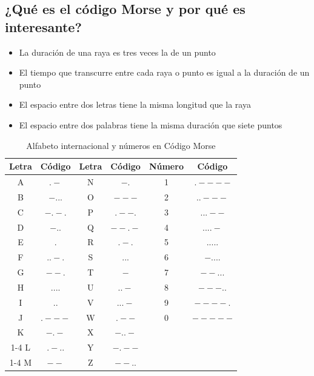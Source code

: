 \subsection{¿Qué es el código Morse y por qué es interesante?}
\begin{itemize}
    \item La duración de una raya es tres veces la de un punto
    \item El tiempo que transcurre entre cada raya o punto es igual a la duración de un punto
    \item El espacio entre dos letras tiene la misma longitud que la raya
    \item El espacio entre dos palabras tiene la misma duración que siete puntos
\end{itemize}
\begin{table}[h]
    \centering
    \renewcommand{\arraystretch}{1.2} %
    \begin{tabular}{|c|c|c|c|c|c|}
    \hline
    \textbf{Letra} & \textbf{Código} & \textbf{Letra} & \textbf{Código} & \textbf{Número} & \textbf{Código} \\ \hline
    A & \textbf{$.-$}    & N & \textbf{$-.$}    & 1 & \textbf{$.----$} \\ \hline
    B & \textbf{$-...$}  & O & \textbf{$---$}   & 2 & \textbf{$..---$} \\ \hline
    C & \textbf{$-.-.$}  & P & \textbf{$.--.$}  & 3 & \textbf{$...--$} \\ \hline
    D & \textbf{$-..$}   & Q & \textbf{$--.-$}  & 4 & \textbf{$....-$} \\ \hline
    E & \textbf{$.$}     & R & \textbf{$.-.$}   & 5 & \textbf{$.....$} \\ \hline
    F & \textbf{$..-.$}  & S & \textbf{$...$}   & 6 & \textbf{$-....$} \\ \hline
    G & \textbf{$--.$}   & T & \textbf{$-$}     & 7 & \textbf{$--...$} \\ \hline
    H & \textbf{$....$}  & U & \textbf{$..-$}   & 8 & \textbf{$---..$} \\ \hline
    I & \textbf{$..$}    & V & \textbf{$...-$}  & 9 & \textbf{$----.$} \\ \hline
    J & \textbf{$.---$}  & W & \textbf{$.--$}   & 0 & \textbf{$-----$} \\ \hline
    K & \textbf{$-.-$}   & X & \textbf{$-..-$}  & \multicolumn{2}{c|}{} \\ \cline{1-4}
    L & \textbf{$.-..$}  & Y & \textbf{$-.--$}  & \multicolumn{2}{c|}{} \\ \cline{1-4}
    M & \textbf{$--$}    & Z & \textbf{$--..$}  & \multicolumn{2}{c|}{} \\ \hline
    \end{tabular}
    \caption{Alfabeto internacional y números en Código Morse}
    \label{tab:morse_alfabeto}
\end{table}

